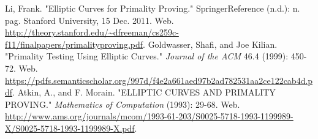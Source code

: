 \documentclass[]{article}
\begin{document}
\begin{thebibliography}{9}

Li, Frank. "Elliptic Curves for Primality Proving." SpringerReference (n.d.): n. pag. Stanford University, 15 Dec. 2011. Web. \url{http://theory.stanford.edu/~dfreeman/cs259c-f11/finalpapers/primalityproving.pdf}.
Goldwasser, Shafi, and Joe Kilian. "Primality Testing Using Elliptic Curves." \emph{Journal of the ACM} 46.4 (1999): 450-72. Web. \url{https://pdfs.semanticscholar.org/997d/f4e2a661aed97b2ad782531aa2ce122cab4d.pdf}.
Atkin, A., and F. Morain. "ELLIPTIC CURVES AND PRIMALITY PROVING." \emph{Mathematics of Computation} (1993): 29-68. Web. \url{http://www.ams.org/journals/mcom/1993-61-203/S0025-5718-1993-1199989-X/S0025-5718-1993-1199989-X.pdf}.

\end{thebibliography}
\end{document}
